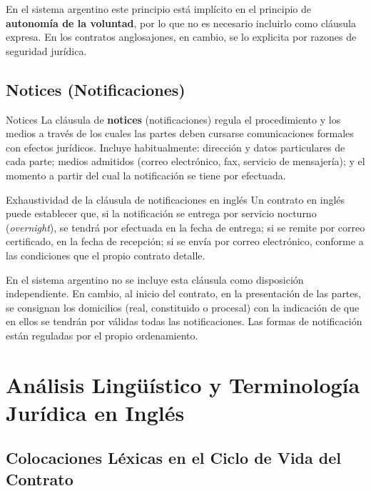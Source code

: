 \documentclass[12pt,oneside]{book}
\begin{document}
En el sistema argentino este principio está implícito en el principio de
\textbf{autonomía de la voluntad}, por lo que no es necesario incluirlo
como cláusula expresa. En los contratos anglosajones, en cambio, se lo
explicita por razones de seguridad jurídica.

\section{Notices (Notificaciones)}

\begin{definition}{Notices}
La cláusula de \textbf{notices} (notificaciones) regula el procedimiento
y los medios a través de los cuales las partes deben cursarse comunicaciones
formales con efectos jurídicos. Incluye habitualmente: dirección y datos
particulares de cada parte; medios admitidos (correo electrónico, fax,
servicio de mensajería); y el momento a partir del cual la notificación
se tiene por efectuada.
\end{definition}

\begin{example}{Exhaustividad de la cláusula de notificaciones en inglés}
Un contrato en inglés puede establecer que, si la notificación se entrega
por servicio nocturno (\textit{overnight}), se tendrá por efectuada en la
fecha de entrega; si se remite por correo certificado, en la fecha de
recepción; si se envía por correo electrónico, conforme a las condiciones
que el propio contrato detalle.
\end{example}

En el sistema argentino no se incluye esta cláusula como disposición
independiente. En cambio, al inicio del contrato, en la presentación de
las partes, se consignan los domicilios (real, constituido o procesal) con
la indicación de que en ellos se tendrán por válidas todas las
notificaciones. Las formas de notificación están reguladas por el propio
ordenamiento.

\chapter{Análisis Lingüístico y Terminología Jurídica en Inglés}

\section{Colocaciones Léxicas en el Ciclo de Vida del Contrato}
\end{document}
